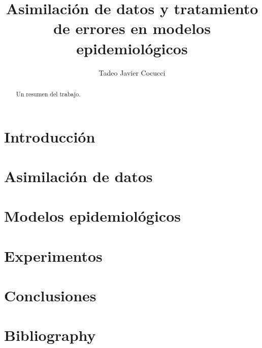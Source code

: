 \documentclass[11pt,a4paper]{article}
\title{Asimilación de datos y tratamiento de errores en modelos epidemiológicos}
\date{}
\author{Tadeo Javier Cocucci}
\begin{document}
\maketitle

\begin{abstract}
    Un resumen del trabajo.
\end{abstract}

\newpage
\tableofcontents

\newpage
\section{Introducción}


\section{Asimilación de datos}


\section{Modelos epidemiológicos}


\section{Experimentos}

\section{Conclusiones}

\section{Bibliography}
\printbibliography[heading=none]
\end{document}
